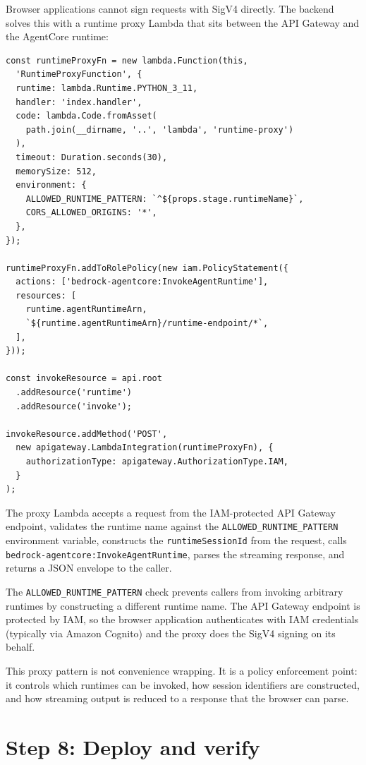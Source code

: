 Browser applications cannot sign requests with SigV4 directly. The backend solves this
with a runtime proxy Lambda that sits between the API Gateway and the AgentCore runtime:

\begin{lstlisting}
const runtimeProxyFn = new lambda.Function(this,
  'RuntimeProxyFunction', {
  runtime: lambda.Runtime.PYTHON_3_11,
  handler: 'index.handler',
  code: lambda.Code.fromAsset(
    path.join(__dirname, '..', 'lambda', 'runtime-proxy')
  ),
  timeout: Duration.seconds(30),
  memorySize: 512,
  environment: {
    ALLOWED_RUNTIME_PATTERN: `^${props.stage.runtimeName}`,
    CORS_ALLOWED_ORIGINS: '*',
  },
});

runtimeProxyFn.addToRolePolicy(new iam.PolicyStatement({
  actions: ['bedrock-agentcore:InvokeAgentRuntime'],
  resources: [
    runtime.agentRuntimeArn,
    `${runtime.agentRuntimeArn}/runtime-endpoint/*`,
  ],
}));

const invokeResource = api.root
  .addResource('runtime')
  .addResource('invoke');

invokeResource.addMethod('POST',
  new apigateway.LambdaIntegration(runtimeProxyFn), {
    authorizationType: apigateway.AuthorizationType.IAM,
  }
);
\end{lstlisting}

The proxy Lambda accepts a request from the IAM-protected API Gateway endpoint, validates
the runtime name against the \texttt{ALLOWED\_RUNTIME\_PATTERN} environment variable,
constructs the \texttt{runtimeSessionId} from the request, calls
\texttt{bedrock-agentcore:InvokeAgentRuntime}, parses the streaming response, and returns
a JSON envelope to the caller.

The \texttt{ALLOWED\_RUNTIME\_PATTERN} check prevents callers from invoking arbitrary
runtimes by constructing a different runtime name. The API Gateway endpoint is protected
by IAM, so the browser application authenticates with IAM credentials (typically via
Amazon Cognito) and the proxy does the SigV4 signing on its behalf.

This proxy pattern is not convenience wrapping. It is a policy enforcement point: it
controls which runtimes can be invoked, how session identifiers are constructed, and how
streaming output is reduced to a response that the browser can parse.

\section{Step 8: Deploy and verify}

